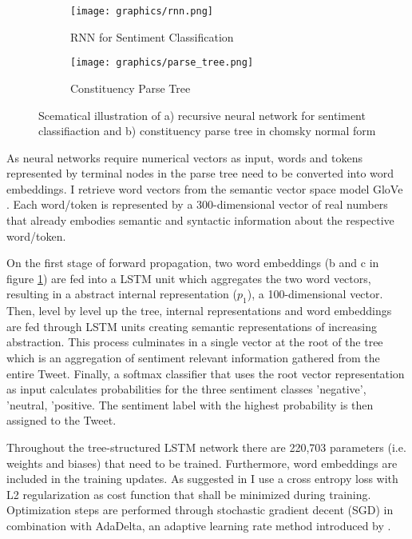 \documentclass[a4paper,12pt]{article}%
\begin{document}
\begin{figure}
\captionsetup{justification=centering}
 \begin{subfigure}[b]{0.5\textwidth}
        \centering
        \texttt{[image: graphics/rnn.png]}
        \caption{RNN for Sentiment Classification\protect\footnotemark \label{fig:rnn}}
   \end{subfigure}
 \begin{subfigure}[b]{0.5\textwidth}
        \centering
        \texttt{[image: graphics/parse\_tree.png]}
        \caption{Constituency Parse Tree\protect\footnotemark \label{parse_tree}}
   \end{subfigure}
\caption{Scematical illustration of a) recursive neural network for sentiment classifiaction and b) constituency parse tree in chomsky normal form \label{fig:RNN_parse_tree}}
\end{figure}


As neural networks require numerical vectors as input, words and tokens represented by terminal nodes in the parse tree need to be converted into word embeddings. I retrieve word vectors from the semantic vector space model GloVe \citep{Pennington2014}. Each word/token is represented by a 300-dimensional vector of real numbers that already embodies semantic and syntactic information about the respective word/token.

On the first stage of forward propagation, two word embeddings (b and c in figure \ref{fig:rnn}) are fed into a LSTM unit which aggregates the two word vectors, resulting in a abstract internal representation ($p_1$), a 100-dimensional vector. Then, level by level up the tree, internal representations and word embeddings are fed through LSTM units creating semantic representations of increasing abstraction. This process culminates in a single vector at the root of the tree which is an aggregation of sentiment relevant information gathered from the entire Tweet. Finally, a softmax classifier that uses the root vector representation as input calculates probabilities for the three sentiment classes 'negative', 'neutral, 'positive. The sentiment label with the highest probability is then assigned to the Tweet.

Throughout the tree-structured LSTM network there are 220,703 parameters (i.e. weights and biases) that need to be trained. Furthermore, word embeddings are included in the training updates. As suggested in \citet{Tai2015} I use a cross entropy loss with L2 regularization as cost function that shall be minimized during training. Optimization steps are performed through stochastic gradient decent (SGD) in combination with AdaDelta, an adaptive learning rate method introduced by \citet{Zeiler2012}.
\end{document}

